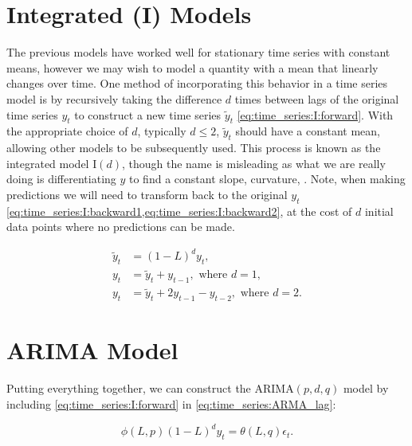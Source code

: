 \section{Integrated (I) Models}
\label{time_series:I}

The previous models have worked well for stationary time series with constant means,
however we may wish to model a quantity with a mean that linearly changes over time.
One method of incorporating this behavior in a time series model is by
recursively taking the difference $d$ times between lags of the original time series $y_{t}$
to construct a new time series $\widetilde{y}_{t}$ \cref{eq:time_series:I:forward}.
With the appropriate choice of $d$, typically $d \leq 2$,
$\widetilde{y}_{t}$ should have a constant mean,
allowing other models to be subsequently used.
This process is known as the integrated model $\text{I}\left(d\right)$,
though the name is misleading as what we are really doing is differentiating $y$ to find a constant slope, curvature, \etc.
Note, when making predictions we will need to
transform back to the original $y_{t}$ \cref{eq:time_series:I:backward1,eq:time_series:I:backward2},
at the cost of $d$ initial data points where no predictions can be made.

\begin{subequations}\label{eq:time_series:I}
\begin{align}
\widetilde{y}_{t} &= \left(1-L\right)^{d} y_{t}, \label{eq:time_series:I:forward} \\
y_{t} &= \widetilde{y}_{t} + y_{t-1},\,\, \text{where}\,\, d=1, \label{eq:time_series:I:backward1} \\
y_{t} &= \widetilde{y}_{t} + 2 y_{t-1} - y_{t-2},\,\, \text{where}\,\, d=2. \label{eq:time_series:I:backward2}
\end{align}
\end{subequations}

\section{ARIMA Model}
\label{time_series:ARIMA}

Putting everything together, we can construct the $\text{ARIMA}\left(p,d,q\right)$ model
by including \cref{eq:time_series:I:forward} in \cref{eq:time_series:ARMA_lag}:

\begin{equation}\label{eq:time_series:ARIMA}
\phi\left(L,p\right) \left(1-L\right)^{d} y_{t} = \theta\left(L,q\right) \epsilon_{t}.
\end{equation}


